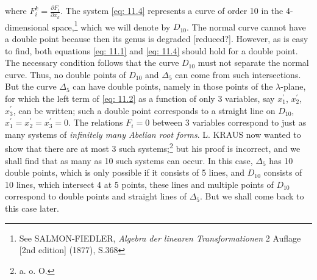 \documentclass[leqno]{article}
\begin{document}
where $F_i^k = \frac{\partial F_i}{\partial x_k}$. The system \eqref{eq: 11.4} represents a curve of order 10 in the 4-dimensional space,\footnote{See SALMON-FIEDLER, \textit{Algebra der linearen Transformationen} 2 Auflage [2nd edition] (1877), S.368} which we will denote by $D_{10}$. The normal curve cannot have a double point because then its genus is degraded [reduced?]. However, as is easy to find, both equations \eqref{eq: 11.1} and \eqref{eq: 11.4} should hold for a double point. The necessary condition follows that the curve $D_{10}$ must not separate the normal curve. Thus, no double points of $D_{10}$ and $\Delta_5$ can come from such intersections. But the curve $\Delta_5$ can have double points, namely in those points of the $\lambda$-plane, for which the left term of \eqref{eq: 11.2} as a function of only 3 variables, say $x_1^\prime$, $x_2^\prime$, $x_3^\prime$, can be written; such a double point corresponds to a straight line on $D_{10}$, $x_1^\prime=x_2^\prime=x_3^\prime=0$. The relations $F_i=0$ between 3 variables correspond to just as many systems of \textit{infinitely many Abelian root forms}. L. KRAUS now wanted to show that there are at most 3 such systems;\footnote{a. o. O.} but his proof is incorrect, and we shall find that as many as 10 such systems can occur. In this case, $\Delta_5$ has 10 double points, which is only possible if it consists of 5 lines, and $D_{10}$ consists of 10 lines, which intersect 4 at 5 points, these lines and multiple points of $D_{10}$ correspond to double points and straight lines of $\Delta_5$. But we shall come back to this case later. \\
\end{document}
